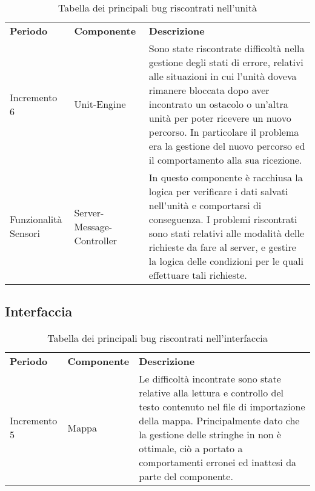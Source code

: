 \begin{table} [!ht]
	\begin{center}
		\begin{tabular} { m{2.5cm} m{2.5cm} m{11cm}  }
			\rowcolor{lightgray}
			\textbf{Periodo} & \textbf{Componente} & \textbf{Descrizione}\\
			
			Incremento 6 & Unit-Engine & Sono state riscontrate difficoltà nella gestione degli stati di errore, relativi alle situazioni in cui l'unità doveva rimanere bloccata dopo aver incontrato un ostacolo o un'altra unità per poter ricevere un nuovo percorso. In particolare il problema era la gestione del nuovo percorso ed il comportamento alla sua ricezione. \\
			
			Funzionalità Sensori & Server-Message-Controller & In questo componente è racchiusa la logica per verificare i dati salvati nell'unità e comportarsi di conseguenza. I problemi riscontrati sono stati relativi alle modalità delle richieste da fare al server, e gestire la logica delle condizioni per le quali effettuare tali richieste. \\
			
		\end{tabular}
	\end{center}
	\caption{Tabella dei principali bug riscontrati nell'unità}
\end{table}

\subsection{Interfaccia}

\begin{table} [!ht]
	\begin{center}
		\begin{tabular} { m{2.5cm} m{2.5cm} m{11cm}  }
			\rowcolor{lightgray}
			\textbf{Periodo} & \textbf{Componente} & \textbf{Descrizione}\\
			
			Incremento 5 & Mappa & Le difficoltà incontrate sono state relative alla lettura e controllo del testo contenuto nel file di importazione della mappa. Principalmente dato che la gestione delle stringhe in \glock{Javascript} non è ottimale, ciò a portato a comportamenti erronei ed inattesi da parte del componente. \\
			
		\end{tabular}
	\end{center}
	\caption{Tabella dei principali bug riscontrati nell'interfaccia}
\end{table}